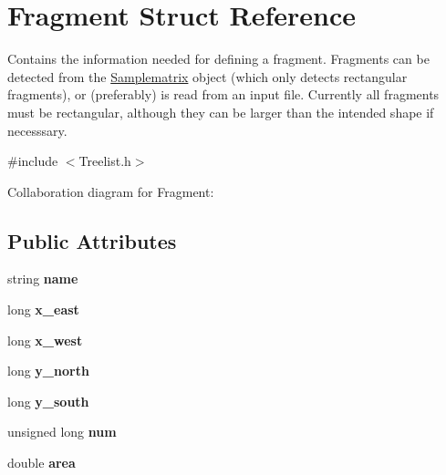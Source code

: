 \hypertarget{struct_fragment}{}\section{Fragment Struct Reference}
\label{struct_fragment}


Contains the information needed for defining a fragment. Fragments can be detected from the \hyperlink{class_samplematrix}{Samplematrix} object (which only detects rectangular fragments), or (preferably) is read from an input file. Currently all fragments must be rectangular, although they can be larger than the intended shape if necesssary.  




{\ttfamily \#include $<$Treelist.\+h$>$}



Collaboration diagram for Fragment\+:
\subsection*{Public Attributes}
\begin{DoxyCompactItemize}
\item 
string {\bfseries name}\hypertarget{struct_fragment_acf92da0ecedecb7080adf56e35543636}{}\label{struct_fragment_acf92da0ecedecb7080adf56e35543636}

\item 
long {\bfseries x\+\_\+east}\hypertarget{struct_fragment_a0257d6b1942656e4181eab82cc5392c4}{}\label{struct_fragment_a0257d6b1942656e4181eab82cc5392c4}

\item 
long {\bfseries x\+\_\+west}\hypertarget{struct_fragment_aabfd09652d5abae4b6393fd40e6d3d9d}{}\label{struct_fragment_aabfd09652d5abae4b6393fd40e6d3d9d}

\item 
long {\bfseries y\+\_\+north}\hypertarget{struct_fragment_a1d792c8e975cbc9405ece3a90a283c4f}{}\label{struct_fragment_a1d792c8e975cbc9405ece3a90a283c4f}

\item 
long {\bfseries y\+\_\+south}\hypertarget{struct_fragment_a71d7c613d71459b72158ef80ba705bfc}{}\label{struct_fragment_a71d7c613d71459b72158ef80ba705bfc}

\item 
unsigned long {\bfseries num}\hypertarget{struct_fragment_ac966a3ac928cba2706ca9c87f159d1ee}{}\label{struct_fragment_ac966a3ac928cba2706ca9c87f159d1ee}

\item 
double {\bfseries area}\hypertarget{struct_fragment_ad37e6d449d9b0b1273e712e5a4da2887}{}\label{struct_fragment_ad37e6d449d9b0b1273e712e5a4da2887}

\end{DoxyCompactItemize}


